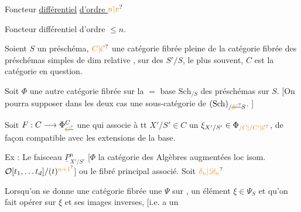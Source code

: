 
Foncteur \uline{différentiel} \uline{d'ordre $\unsure{n|r}$}


Foncteur différentiel d'ordre $\leq n$.

Soient $S$ un préschéma, $\unsure{C|\mathcal C}$  une  catégorie fibrée pleine de la catégorie fibrée des préschémas simples de dim relative , sur des $S'/S$,  le plus souvent, $C$ est  la catégorie en question.

Soit $\Phi$ une autre catégorie fibrée sur la $=$ base $\mathrm{Sch}_{/S}$ des préschémas sur $S$. [On pourra supposer dans les deux cas  une sous-catégorie de $(\mathrm{Sch})_{/\deleted{\unsure{S'}}S}$.  ]

Soit $F:C\longrightarrow\Phi_{\deleted{\unsure{C}}}^{C}$ une   qui associe à tt $X'/S'\in C$ un $\xi_{X'/S'}\in\Phi_{\unsure{/C|/C'|\mathcal C}}$, de façon compatible  avec les extensions de la base.

Ex : Le faisceau $\underline P^n_{X'/S'}$ [$\Phi$ la catégorie des Algèbres augmentées loc isom.  $\mathcal O[t_1,\ldots t_d]/(t)^{\unsure{n+1}}$] ou le fibré principal associé. Soit $\unsure{\delta_n|\mathscr D_n}$

Lorsqu'on se donne une catégorie fibrée une $\Psi$ sur  , un élément $\xi\in\Psi_S$ et qu'on  fait opérer   sur $\xi$ et ses images inverses, [i.e.  a un

